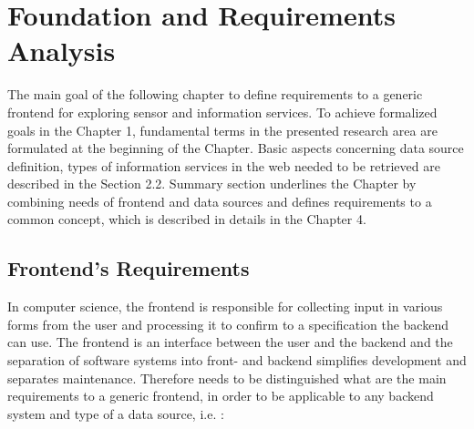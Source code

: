 \chapter{Foundation and Requirements Analysis}
	The main goal of the following chapter to define requirements to a generic frontend for exploring sensor and information services. To achieve formalized goals in the Chapter 1, fundamental terms in the presented research area are formulated at the beginning of the Chapter. Basic aspects concerning data source definition, types of information services in the web needed to be retrieved are described in the Section 2.2. Summary section underlines the Chapter by combining needs of frontend and data sources and defines requirements to a common concept, which is described in details in the Chapter 4.

\section {Frontend's Requirements}
	In computer science, the frontend is responsible for collecting input in various forms from the user and processing it to confirm to a specification the backend can use. The frontend is an interface between the user and the backend\cite{wiki:xxx} and the separation of software systems into front- and backend simplifies development and separates maintenance. Therefore needs to be distinguished what are the main requirements to a generic frontend, in order to be applicable to any backend system and type of a data source, i.e. :

